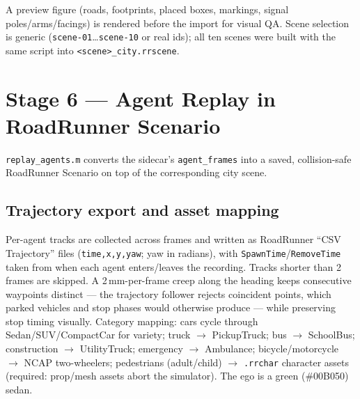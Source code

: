 \documentclass[11pt]{article}
\newcommand{\code}[1]{{\setlength{\fboxsep}{1.5pt}\colorbox{codegray}{\small\texttt{#1}}}}
\newcommand{\file}[1]{\texttt{#1}}
\begin{document}
A preview figure (roads, footprints, placed boxes, markings, signal poles/arms/facings)
is rendered before the import for visual QA. Scene selection is generic
(\code{scene-01}\ldots\code{scene-10} or real ids); all ten scenes were built with the
same script into \file{<scene>\_city.rrscene}.

\section{Stage 6 --- Agent Replay in RoadRunner Scenario}
\label{sec:rrreplay}

\file{replay\_agents.m} converts the sidecar's \code{agent\_frames} into a saved,
collision-safe RoadRunner Scenario on top of the corresponding city scene.

\subsection{Trajectory export and asset mapping}
Per-agent tracks are collected across frames and written as RoadRunner ``CSV
Trajectory'' files (\code{time,x,y,yaw}; yaw in radians), with
\code{SpawnTime}/\code{RemoveTime} taken from when each agent enters/leaves the
recording. Tracks shorter than 2 frames are skipped. A 2\,mm-per-frame creep along the
heading keeps consecutive waypoints distinct --- the trajectory follower rejects
coincident points, which parked vehicles and stop phases would otherwise produce ---
while preserving stop timing visually. Category mapping: cars cycle through
Sedan/SUV/CompactCar for variety; truck $\rightarrow$ PickupTruck; bus $\rightarrow$
SchoolBus; construction $\rightarrow$ UtilityTruck; emergency $\rightarrow$ Ambulance;
bicycle/motorcycle $\rightarrow$ NCAP two-wheelers; pedestrians (adult/child)
$\rightarrow$ \file{.rrchar} character assets (required: prop/mesh assets abort the
simulator). The ego is a green (\#00B050) sedan.
\end{document}
